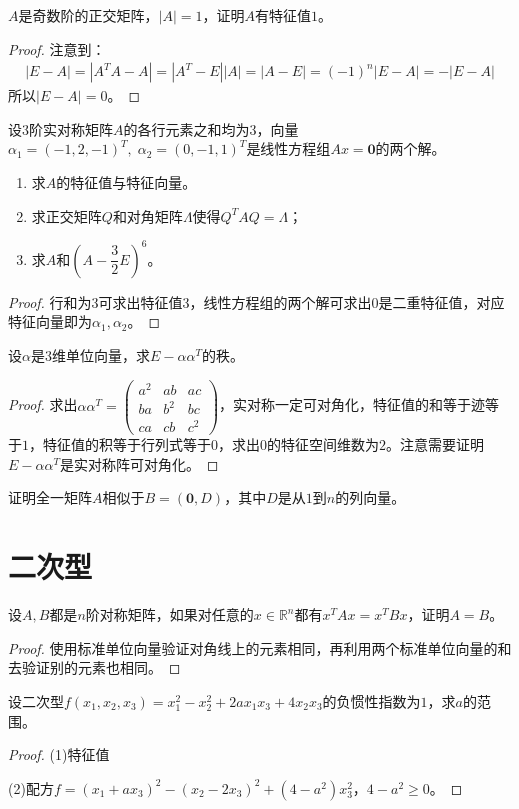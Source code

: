\begin{theorem}
	$A$是奇数阶的正交矩阵，$|A|=1$，证明$A$有特征值$1$。
\end{theorem}
\begin{proof}
	注意到：
	\begin{align*}
		|E-A|=|A^TA-A|=|A^T-E||A|=|A-E|=(-1)^n|E-A|=-|E-A|
	\end{align*}
	所以$|E-A|=0$。
\end{proof}
\begin{theorem}
	设$3$阶实对称矩阵$A$的各行元素之和均为$3$，向量$\alpha_1=(-1,2,-1)^T,\;\alpha_2=(0,-1,1)^T$是线性方程组$Ax=\mathbf{0}$的两个解。
	\begin{enumerate}
		\item 求$A$的特征值与特征向量。
		\item 求正交矩阵$Q$和对角矩阵$\varLambda$使得$Q^TAQ=\varLambda$；
		\item 求$A$和$(A-\dfrac{3}{2}E)^6$。
	\end{enumerate}
\end{theorem}
\begin{proof}
	行和为$3$可求出特征值$3$，线性方程组的两个解可求出$0$是二重特征值，对应特征向量即为$\alpha_1,\alpha_2$。
\end{proof}

\begin{theorem}
	设$\alpha$是$3$维单位向量，求$E-\alpha\alpha^T$的秩。
\end{theorem}
\begin{proof}
	求出$\alpha\alpha^T=
	\begin{pmatrix}
		a^2 & ab & ac \\
		ba & b^2 & bc \\
		ca & cb & c^2
	\end{pmatrix}$，实对称一定可对角化，特征值的和等于迹等于$1$，特征值的积等于行列式等于$0$，求出$0$的特征空间维数为$2$。注意需要证明$E-\alpha\alpha^T$是实对称阵可对角化。
\end{proof}
\begin{theorem}
	证明全一矩阵$A$相似于$B=(\mathbf{0},D)$，其中$D$是从$1$到$n$的列向量。
\end{theorem}

\chapter{二次型}
\begin{theorem}
	设$A,B$都是$n$阶对称矩阵，如果对任意的$x\in\mathbb{R}^{n}$都有$x^TAx=x^TBx$，证明$A=B$。
\end{theorem}
\begin{proof}
	使用标准单位向量验证对角线上的元素相同，再利用两个标准单位向量的和去验证别的元素也相同。
\end{proof}
\begin{theorem}
	设二次型$f(x_1,x_2,x_3)=x_1^2-x_2^2+2ax_1x_3+4x_2x_3$的负惯性指数为$1$，求$a$的范围。
\end{theorem}
\begin{proof}
	(1)特征值\par
	(2)配方$f=(x_1+ax_3)^2-(x_2-2x_3)^2+(4-a^2)x_3^2$，$4-a^2\geqslant0$。
\end{proof}


